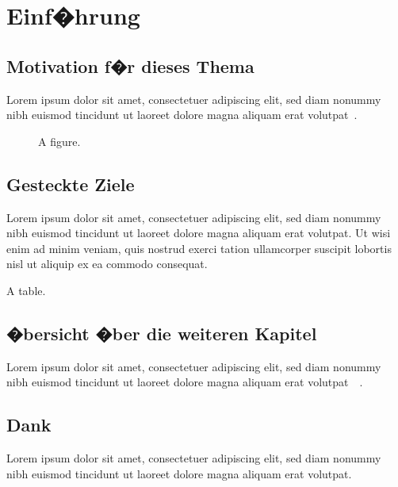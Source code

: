 \chapter {Einf�hrung}

\section{Motivation f�r dieses Thema}

Lorem ipsum dolor sit amet, consectetuer adipiscing elit, sed diam
nonummy nibh euismod tincidunt ut laoreet dolore magna aliquam erat
volutpat~\cite{Kolmogorov2005}.

\begin{figure}
\caption{A figure.}
\end{figure}


\section{Gesteckte Ziele}

Lorem ipsum dolor sit amet, consectetuer adipiscing elit, sed diam
nonummy nibh euismod tincidunt ut laoreet dolore magna aliquam erat
volutpat. Ut wisi enim ad minim veniam, quis nostrud exerci tation
ullamcorper suscipit lobortis nisl ut aliquip ex ea commodo
consequat.

\begin{table}
\caption{A table.}
\end{table}


\section{�bersicht �ber die weiteren Kapitel}

Lorem ipsum dolor sit amet, consectetuer adipiscing elit, sed diam
nonummy nibh euismod tincidunt ut laoreet dolore magna aliquam erat
volutpat~\cite{Pankaj2002}~.


\section{Dank}

Lorem ipsum dolor sit amet, consectetuer adipiscing elit, sed diam
nonummy nibh euismod tincidunt ut laoreet dolore magna aliquam erat
volutpat.

